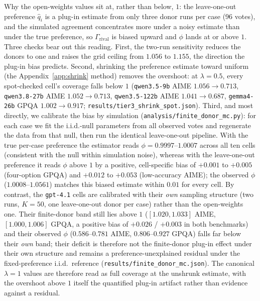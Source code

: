 \documentclass[a4paper,fleqn]{cas-sc}
\newcommand{\agreementIndex}{\Gamma}
\begin{document}
Why the open-weights values sit at, rather than below, $1$: the
leave-one-out preference $\hat q_i$ is a plug-in estimate from only
three donor runs per case (96 votes), and the simulated agreement
concentrates more under a noisy estimate than under the true preference,
so $\agreementIndex_{\mathrm{rival}}$ is biased upward and $\phi$ lands at or
above $1$. Three checks bear out this reading. First, the two-run
sensitivity reduces the donors to one and raises the grid ceiling from
$1.056$ to $1.155$, the direction the plug-in bias predicts. Second,
shrinking the preference estimate toward uniform (the
Appendix~\ref{app:shrink} method) removes the overshoot: at
$\lambda=0.5$, every spot-checked cell's coverage falls below $1$
(\texttt{qwen3.5-9b} AIME $1.056\to0.713$,
\texttt{qwen3.8-27b} AIME $1.052\to0.713$,
\texttt{qwen3.5-122b} AIME $1.041\to0.687$,
\texttt{gemma4-26b} GPQA $1.002\to0.917$;
\texttt{results/tier3\_shrink\_spot.json}). Third, and most directly, we
calibrate the bias by simulation
(\texttt{analysis/finite\_donor\_mc.py}): for each case we fit the
i.i.d.-null parameters from all observed votes and regenerate the data
from that null, then run the identical leave-one-out pipeline. With the
true per-case preference the estimator reads
$\phi=0.9997$--$1.0007$ across all ten cells (consistent with the null
within simulation noise), whereas with the leave-one-out preference it reads
$\phi$ above $1$ by a positive, cell-specific bias of $+0.001$ to
$+0.005$ (four-option GPQA) and $+0.012$ to $+0.053$ (low-accuracy AIME);
the observed $\phi$ ($1.0008$--$1.0561$) matches this biased estimate
within $0.01$ for every cell. By contrast, the \texttt{gpt-4.1} cells are calibrated with their
\emph{own} sampling structure (two runs, $K=50$, one leave-one-out donor per
case) rather than the open-weights one. Their finite-donor band still lies
above $1$ ($[1.020,1.033]$ AIME, $[1.000,1.006]$ GPQA, a positive bias of
$+0.026$ / $+0.003$ in both benchmarks) and their observed
$\phi$ ($0.586$--$0.781$ AIME, $0.806$--$0.927$ GPQA) falls far
below their \emph{own} band; their deficit is therefore not the finite-donor
plug-in effect under their own structure and remains a preference-unexplained
residual under the fixed-preference i.i.d.\ reference
(\texttt{results/finite\_donor\_mc.json}). The canonical $\lambda=1$
values are therefore read as full coverage at the unshrunk
estimate, with the overshoot above $1$ itself the quantified plug-in
artifact rather than evidence against a residual.
\end{document}
